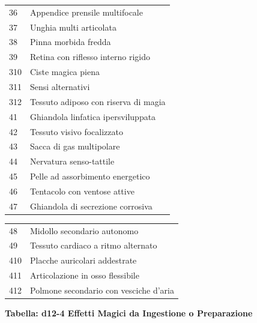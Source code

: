 \begin{multicols}{2}
\begin{tabularx}{\linewidth}{lX}
 \rowcolor{gray!20}36 & Appendice prensile multifocale \\
	37 & Unghia multi articolata \\
 \rowcolor{gray!20}38 & Pinna morbida fredda \\
	39 & Retina con riflesso interno rigido \\
 \rowcolor{gray!20}310 & Ciste magica piena \\
	311 & Sensi alternativi \\
 \rowcolor{gray!20}312 & Tessuto adiposo con riserva di magia \\
	41 & Ghiandola linfatica ipersviluppata \\
 \rowcolor{gray!20}42 & Tessuto visivo focalizzato \\
	43 & Sacca di gas multipolare \\
 \rowcolor{gray!20}44 & Nervatura senso-tattile \\
 	45 & Pelle ad assorbimento energetico \\
 \rowcolor{gray!20}46 & Tentacolo con ventose attive \\
	47 & Ghiandola di secrezione corrosiva \\
 		\end{tabularx}
\noindent\begin{tabularx}{\linewidth}{lX}
 \rowcolor{gray!20}48 & Midollo secondario autonomo \\
	49 & Tessuto cardiaco a ritmo alternato \\
 \rowcolor{gray!20}410 & Placche auricolari addestrate \\
	411 & Articolazione in osso flessibile \\
 \rowcolor{gray!20}412 & Polmone secondario con vesciche d’aria \\
\end{tabularx}

\medskip

\textbf{Tabella: d12-4 Effetti Magici da Ingestione o Preparazione}

\medskip


\end{multicols}
